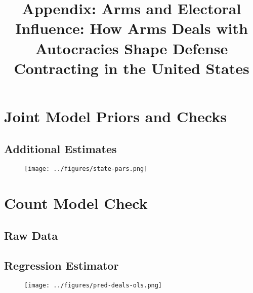 \documentclass[12pt]{article}
\title{\textbf{Appendix: Arms and Electoral Influence: How Arms Deals with Autocracies Shape Defense Contracting in the United States}}
\date{}
\begin{document}
\maketitle 

\singlespace 

\tableofcontents

\bigskip


\section{Joint Model Priors and Checks} 


\subsection{Additional Estimates}


\begin{figure}[htpb]
	\centering
		\texttt{[image: ../figures/state-pars.png]}
	\caption{}
	\label{fig:state-pars}
\end{figure}




\section{Count Model Check}

\subsection{Raw Data}


\subsection{Regression Estimator}


\begin{figure}[htpb]
	\centering
		\texttt{[image: ../figures/pred-deals-ols.png]}
	\caption{}
	\label{fig:pred-deals-ols}
\end{figure}


\newpage
\singlespace
 
 
\end{document}
